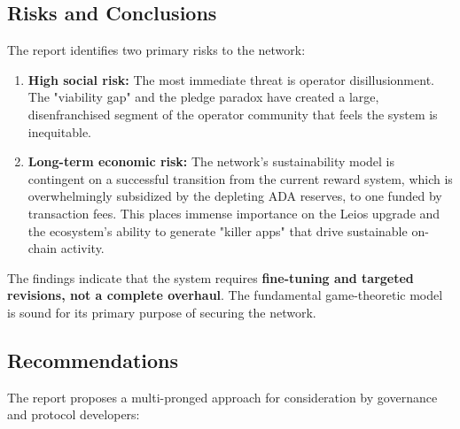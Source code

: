 \documentclass[11pt, letterpaper]{article}
\begin{document}
\subsection*{Risks and Conclusions}

The report identifies two primary risks to the network:

\begin{enumerate}
    \item \textbf{High social risk:} The most immediate threat is operator disillusionment. The "viability gap" 
    and the pledge paradox have created a large, disenfranchised segment of the operator community that feels the 
    system is inequitable.
    
    \item \textbf{Long-term economic risk:} The network's sustainability model is contingent on a successful 
    transition from the current reward system, which is overwhelmingly subsidized by the depleting ADA reserves,
    to one funded by transaction fees. This places immense importance on the Leios upgrade and the ecosystem's 
    ability to generate "killer apps" that drive sustainable on-chain activity.
\end{enumerate}

The findings indicate that the system requires \textbf{fine-tuning and targeted revisions, not a complete overhaul}. The fundamental game-theoretic model is sound for its primary purpose of securing the network.

\subsection*{Recommendations}

The report proposes a multi-pronged approach for consideration by governance and protocol developers:
\end{document}
